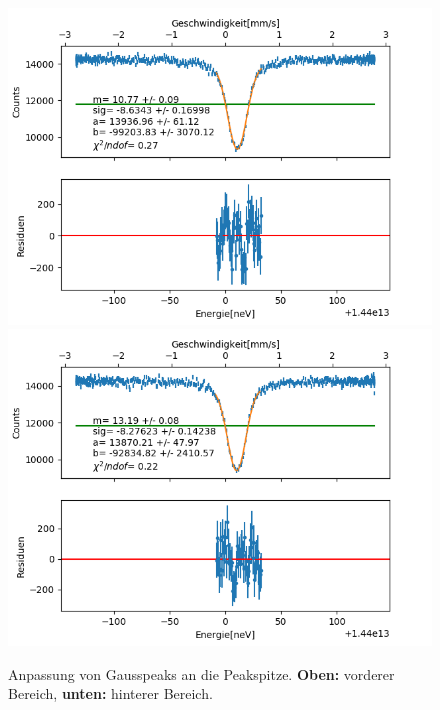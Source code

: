 \documentclass[12pt,a4paper]{article}
\begin{document}
\begin{figure}[H]
\centering
\includegraphics[scale=0.8]{Bilder/Einlinien/Ein_halbgauss_vor.png}
\includegraphics[scale=0.8]{Bilder/Einlinien/Ein_halbgauss_nach.png}
\caption{Anpassung von Gausspeaks an die Peakspitze. \textbf{Oben:} vorderer Bereich, \textbf{unten:} hinterer Bereich.}
\label{fig:Ein_halbgauss}
\end{figure}
\end{document}
